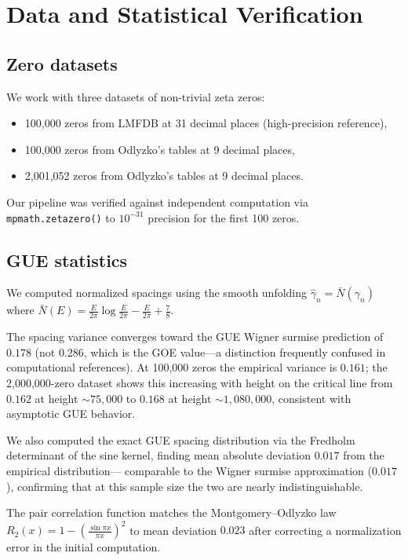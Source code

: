 \documentclass[11pt]{article}
\begin{document}
\section{Data and Statistical Verification}

\subsection{Zero datasets}

We work with three datasets of non-trivial zeta zeros:
\begin{itemize}
\item 100{,}000 zeros from LMFDB at 31 decimal places (high-precision reference),
\item 100{,}000 zeros from Odlyzko's tables at 9 decimal places,
\item 2{,}001{,}052 zeros from Odlyzko's tables at 9 decimal places.
\end{itemize}

Our pipeline was verified against independent computation via \texttt{mpmath.zetazero()}
to $10^{-31}$ precision for the first 100 zeros.

\subsection{GUE statistics}

We computed normalized spacings using the smooth unfolding
$\hat{\gamma}_n = \bar{N}(\gamma_n)$ where
$\bar{N}(E) = \frac{E}{2\pi}\log\frac{E}{2\pi} - \frac{E}{2\pi} + \frac{7}{8}$.

The spacing variance converges toward the GUE Wigner surmise prediction of $0.178$
(not $0.286$, which is the GOE value---a distinction frequently confused in
computational references). At 100{,}000 zeros the empirical variance is $0.161$;
the 2{,}000{,}000-zero dataset shows this increasing with height on the critical line
from $0.162$ at height $\sim 75{,}000$ to $0.168$ at height $\sim 1{,}080{,}000$,
consistent with asymptotic GUE behavior.

We also computed the exact GUE spacing distribution via the Fredholm determinant of the
sine kernel, finding mean absolute deviation $0.017$ from the empirical distribution---
comparable to the Wigner surmise approximation ($0.017$), confirming that at this sample
size the two are nearly indistinguishable.

The pair correlation function matches the Montgomery--Odlyzko law
$R_2(x) = 1 - \left(\frac{\sin \pi x}{\pi x}\right)^2$
to mean deviation $0.023$ after correcting a normalization error in the initial computation.
\end{document}
